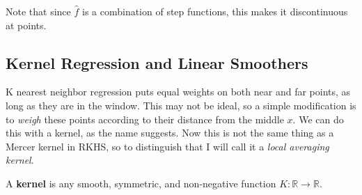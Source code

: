     Note that since $\hat{f}$ is a combination of step functions, this makes it discontinuous at points. 

  \subsection{Kernel Regression and Linear Smoothers} 

    K nearest neighbor regression puts equal weights on both near and far points, as long as they are in the window. This may not be ideal, so a simple modification is to \textit{weigh} these points according to their distance from the middle $x$. We can do this with a kernel, as the name suggests. Now this is not the same thing as a Mercer kernel in RKHS, so to distinguish that I will call it a \textit{local averaging kernel}. 

    \begin{definition}
      A \textbf{kernel} is any smooth, symmetric, and non-negative function $K : \mathbb{R} \to \mathbb{R}$.  
    \end{definition}

